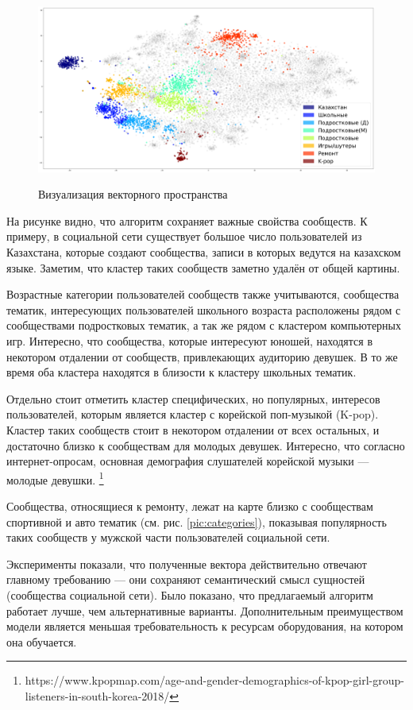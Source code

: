 \documentclass[times,specification,annotation]{itmo-student-thesis}
\begin{document}
\begin{figure}[h]
\caption{Визуализация векторного пространства}
\centering
\includegraphics[width=1\textwidth]{clusters}
\label{pic:clusters}
\end{figure}

На рисунке видно, что алгоритм сохраняет важные свойства сообществ. К примеру, в социальной сети существует большое число пользователей из Казахстана, которые создают сообщества, записи в которых ведутся на казахском языке. Заметим, что кластер таких сообществ заметно удалён от общей картины. 

Возрастные категории пользователей сообществ также учитываются, сообщества тематик, интересующих пользователей школьного возраста расположены рядом с сообществами подростковых тематик, а так же рядом с кластером компьютерных игр. Интересно, что сообщества, которые интересуют юношей, находятся в некотором отдалении от сообществ, привлекающих аудиторию девушек. В то же время оба кластера находятся в близости к кластеру школьных тематик.

Отдельно стоит отметить кластер специфических, но популярных, интересов пользователей, которым является кластер с корейской поп-музыкой (K-pop). Кластер таких сообществ стоит в некотором отдалении от всех остальных, и достаточно близко к сообществам для молодых девушек. Интересно, что согласно интернет-опросам, основная демография слушателей корейской музыки --- молодые девушки. \footnote{https://www.kpopmap.com/age-and-gender-demographics-of-kpop-girl-group-listeners-in-south-korea-2018/}

Сообщества, относящиеся к ремонту, лежат на карте близко с сообществам спортивной и авто тематик (см. рис. \ref{pic:categories}), показывая популярность таких сообществ у мужской части пользователей социальной сети.    

\chapterconclusion

Эксперименты показали, что полученные вектора действительно отвечают главному требованию --- они сохраняют семантический смысл сущностей (сообщества социальной сети). Было показано, что предлагаемый алгоритм работает лучше, чем альтернативные варианты. Дополнительным преимуществом модели является меньшая требовательность к ресурсам оборудования, на котором она обучается. 
\end{document}
